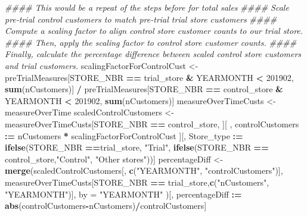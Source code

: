 \documentclass[
]{article}
\newenvironment{Shaded}{\begin{snugshade}}{\end{snugshade}}
\newcommand{\CommentTok}[1]{\textcolor[rgb]{0.56,0.35,0.01}{\textit{#1}}}
\newcommand{\DataTypeTok}[1]{\textcolor[rgb]{0.13,0.29,0.53}{#1}}
\newcommand{\DecValTok}[1]{\textcolor[rgb]{0.00,0.00,0.81}{#1}}
\newcommand{\ErrorTok}[1]{\textcolor[rgb]{0.64,0.00,0.00}{\textbf{#1}}}
\newcommand{\KeywordTok}[1]{\textcolor[rgb]{0.13,0.29,0.53}{\textbf{#1}}}
\newcommand{\NormalTok}[1]{#1}
\newcommand{\OperatorTok}[1]{\textcolor[rgb]{0.81,0.36,0.00}{\textbf{#1}}}
\newcommand{\StringTok}[1]{\textcolor[rgb]{0.31,0.60,0.02}{#1}}
\begin{document}
\begin{Shaded}
\begin{Highlighting}[]
\CommentTok{#### This would be a repeat of the steps before for total sales}
\CommentTok{#### Scale pre-trial control customers to match pre-trial trial store customers}
\CommentTok{#### Compute a scaling factor to align control store customer counts to our trial store.}
\CommentTok{#### Then, apply the scaling factor to control store customer counts.}
\CommentTok{#### Finally, calculate the percentage difference between scaled control store customers and trial customers.}
\NormalTok{scalingFactorForControlCust <-}\StringTok{ }\NormalTok{preTrialMeasures[STORE_NBR }\OperatorTok{==}\StringTok{ }\NormalTok{trial_store }\OperatorTok{&}
\NormalTok{YEARMONTH }\OperatorTok{<}\StringTok{ }\DecValTok{201902}\NormalTok{, }\KeywordTok{sum}\NormalTok{(nCustomers)] }\OperatorTok{/}\StringTok{ }\NormalTok{preTrialMeasures[STORE_NBR }\OperatorTok{==}
\NormalTok{control_store }\OperatorTok{&}\StringTok{ }\NormalTok{YEARMONTH }\OperatorTok{<}\StringTok{ }\DecValTok{201902}\NormalTok{, }\KeywordTok{sum}\NormalTok{(nCustomers)]}
\NormalTok{measureOverTimeCusts <-}\StringTok{ }\NormalTok{measureOverTime}
\NormalTok{scaledControlCustomers <-}\StringTok{ }\NormalTok{measureOverTimeCusts[STORE_NBR }\OperatorTok{==}\StringTok{ }\NormalTok{control_store,}
\NormalTok{][ , controlCustomers }\OperatorTok{:}\ErrorTok{=}\StringTok{ }\NormalTok{nCustomers }\OperatorTok{*}\StringTok{ }\NormalTok{scalingFactorForControlCust}
\NormalTok{][, Store_type }\OperatorTok{:}\ErrorTok{=}\StringTok{ }\KeywordTok{ifelse}\NormalTok{(STORE_NBR }\OperatorTok{==}\NormalTok{trial_store, }\StringTok{"Trial"}\NormalTok{,}
\KeywordTok{ifelse}\NormalTok{(STORE_NBR }\OperatorTok{==}\StringTok{ }\NormalTok{control_store,}\StringTok{"Control"}\NormalTok{, }\StringTok{"Other stores"}\NormalTok{))]}
\NormalTok{percentageDiff <-}\StringTok{ }\KeywordTok{merge}\NormalTok{(scaledControlCustomers[, }\KeywordTok{c}\NormalTok{(}\StringTok{"YEARMONTH"}\NormalTok{, }\StringTok{"controlCustomers"}\NormalTok{)],}
\NormalTok{measureOverTimeCusts[STORE_NBR }\OperatorTok{==}\StringTok{ }\NormalTok{trial_store,}\KeywordTok{c}\NormalTok{(}\StringTok{"nCustomers"}\NormalTok{, }\StringTok{"YEARMONTH"}\NormalTok{)],}
\DataTypeTok{by =} \StringTok{"YEARMONTH"}
\NormalTok{)[, percentageDiff }\OperatorTok{:}\ErrorTok{=}\StringTok{ }\KeywordTok{abs}\NormalTok{(controlCustomers}\OperatorTok{-}\NormalTok{nCustomers)}\OperatorTok{/}\NormalTok{controlCustomers]}
\end{Highlighting}
\end{Shaded}
\end{document}

